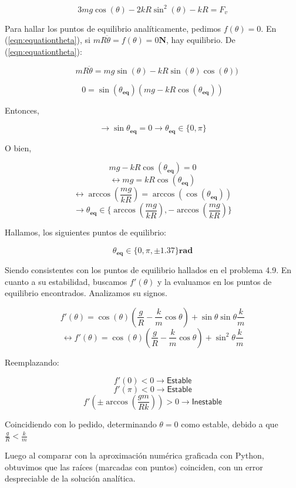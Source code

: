 \documentclass{article}
\begin{document}
   	 $$
   		3mg \cos{(\theta)} - 2kR\sin^2{(\theta)} - kR = F_v
   	 $$
   	 
   	 Para hallar los puntos de equilibrio anal\'iticamente, pedimos $f(\theta) = 0$. En (\ref{eqn:equationtheta}), si $mR \ddot{\theta} = f(\theta) = 0 \textbf{N}$, hay equilibrio. De (\ref{eqn:equationtheta}):
   	 
   	 
   	$$
   	\quad mR\ddot{\theta} = mg \sin{(\theta)} - kR \sin{(\theta)} \cos{(\theta)})
   	$$
   	 
   	$$
   	0 = \sin{(\theta_{\textbf{eq}})} (mg - kR \cos{(\theta_{\textbf{eq}})})
   	$$
   	 
   	Entonces,
   	 
   	 $$\rightarrow \sin{\theta_{\textbf{eq}}} = 0 \rightarrow \theta_{\textbf{eq}} \in \lbrace 0, \pi \rbrace $$
   	 
   	O bien,
   	 
   	$$
		mg - kR \cos{(\theta_{\textbf{eq}})} = 0 
	$$
	$$
		\leftrightarrow mg = kR \cos{(\theta_{\textbf{eq}})} 
   	$$
   	$$
		\leftrightarrow \arccos{\left(\frac{mg}{kR}\right)} = \arccos{(\cos{(\theta_{\textbf{eq}})})} 
   	$$
   	$$
		\rightarrow \theta_{\textbf{eq}} \in \lbrace \arccos{\left(\frac{mg}{kR}\right)}, -\arccos{\left(\frac{mg}{kR}\right)} \rbrace 
   	$$

	Hallamos, los siguientes puntos de equilibrio:
	
	$$\theta_{\textbf{eq}} \in \lbrace 0, \pi, \pm1.37 \rbrace \textbf{rad}$$
	
	Siendo consistentes con los puntos de equilibrio hallados en el problema 4.9. En cuanto a su estabilidad, buscamos $f'(\theta)$ y la evaluamos en los puntos de equilibrio encontrados. Analizamos su signos.
	
	$$
		f'(\theta) = \cos{(\theta)} \left(\frac{g}{R} - \frac{k}{m} \cos{\theta}\right) + \sin{\theta} \sin{\theta} \frac{k}{m}  
	$$
	$$
		\leftrightarrow f'(\theta) = \cos{(\theta)} \left(\frac{g}{R} - \frac{k}{m} \cos{\theta}\right) + \sin^2 {\theta} \frac{k}{m}  
	$$
	
	Reemplazando:
	
	$$f'(0) < 0 \rightarrow \textsf{Estable}$$
	$$f'(\pi) < 0 \rightarrow \textsf{Estable}$$
	$$f'\left(\pm \arccos{\left(\frac{gm}{Rk}\right)}\right) > 0 \rightarrow \textsf{Inestable}$$
	
	Coincidiendo con lo pedido, determinando $\theta = 0$ como estable, debido a que $\frac{g}{R} < \frac{k}{m}$

	Luego al comparar con la aproximaci\'on num\'erica graficada con Python, obtuvimos que las ra\'ices (marcadas con puntos) coinciden, con un error despreciable de la soluci\'on anal\'itica.
	
\end{document}
